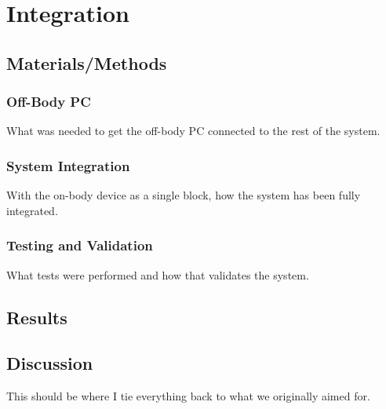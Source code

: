 \chapter{Integration}

\section{Materials/Methods}
\subsection{Off-Body PC}
What was needed to get the off-body PC connected to the rest of the system.

\subsection{System Integration}
With the on-body device as a single block, how the system has been fully integrated.

\subsection{Testing and Validation}
What tests were performed and how that validates the system.

\section{Results}

\section{Discussion}
This should be where I tie everything back to what we originally aimed for.

